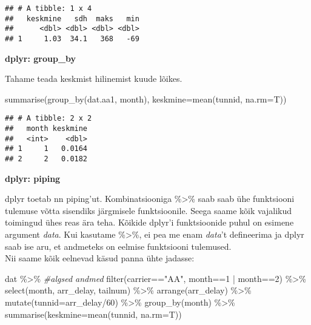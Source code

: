 \documentclass[
]{book}
\newenvironment{Shaded}{\begin{snugshade}}{\end{snugshade}}
\newcommand{\AttributeTok}[1]{\textcolor[rgb]{0.77,0.63,0.00}{#1}}
\newcommand{\CommentTok}[1]{\textcolor[rgb]{0.56,0.35,0.01}{\textit{#1}}}
\newcommand{\DecValTok}[1]{\textcolor[rgb]{0.00,0.00,0.81}{#1}}
\newcommand{\FunctionTok}[1]{\textcolor[rgb]{0.00,0.00,0.00}{#1}}
\newcommand{\NormalTok}[1]{#1}
\newcommand{\SpecialCharTok}[1]{\textcolor[rgb]{0.00,0.00,0.00}{#1}}
\newcommand{\StringTok}[1]{\textcolor[rgb]{0.31,0.60,0.02}{#1}}
\begin{document}
\begin{verbatim}
## # A tibble: 1 x 4
##   keskmine   sdh  maks   min
##      <dbl> <dbl> <dbl> <dbl>
## 1     1.03  34.1   368   -69
\end{verbatim}

\textbf{dplyr: group\_by}

Tahame teada keskmist hilinemist kuude lõikes.

\begin{Shaded}
\begin{Highlighting}[]
\FunctionTok{summarise}\NormalTok{(}\FunctionTok{group\_by}\NormalTok{(dat.aa1, month), }\AttributeTok{keskmine=}\FunctionTok{mean}\NormalTok{(tunnid, }\AttributeTok{na.rm=}\NormalTok{T))}
\end{Highlighting}
\end{Shaded}

\begin{verbatim}
## # A tibble: 2 x 2
##   month keskmine
##   <int>    <dbl>
## 1     1   0.0164
## 2     2   0.0182
\end{verbatim}

\textbf{dplyr: piping}

dplyr toetab nn piping'ut. Kombinatsiooniga \%\textgreater\% saab saab ühe funktsiooni tulemuse võtta sisendiks järgmisele funktsioonile. Seega saame kõik vajalikud toimingud ühes reas ära teha. Kõikide dplyr'i funktsioonide puhul on esimene argument \emph{data}. Kui kasutame \%\textgreater\%, ei pea me enam \emph{data}'t defineerima ja dplyr saab ise aru, et andmeteks on eelmise funktsiooni tulemused.\\
Nii saame kõik eelnevad käsud panna ühte jadasse:

\begin{Shaded}
\begin{Highlighting}[]
\NormalTok{dat }\SpecialCharTok{\%\textgreater{}\%} \CommentTok{\#algsed andmed}
  \FunctionTok{filter}\NormalTok{(carrier}\SpecialCharTok{==}\StringTok{"AA"}\NormalTok{, month}\SpecialCharTok{==}\DecValTok{1} \SpecialCharTok{|}\NormalTok{ month}\SpecialCharTok{==}\DecValTok{2}\NormalTok{) }\SpecialCharTok{\%\textgreater{}\%}
  \FunctionTok{select}\NormalTok{(month, arr\_delay, tailnum) }\SpecialCharTok{\%\textgreater{}\%}
  \FunctionTok{arrange}\NormalTok{(arr\_delay) }\SpecialCharTok{\%\textgreater{}\%}
  \FunctionTok{mutate}\NormalTok{(}\AttributeTok{tunnid=}\NormalTok{arr\_delay}\SpecialCharTok{/}\DecValTok{60}\NormalTok{) }\SpecialCharTok{\%\textgreater{}\%}
  \FunctionTok{group\_by}\NormalTok{(month) }\SpecialCharTok{\%\textgreater{}\%}
  \FunctionTok{summarise}\NormalTok{(}\AttributeTok{keskmine=}\FunctionTok{mean}\NormalTok{(tunnid, }\AttributeTok{na.rm=}\NormalTok{T))}
\end{Highlighting}
\end{Shaded}
\end{document}
